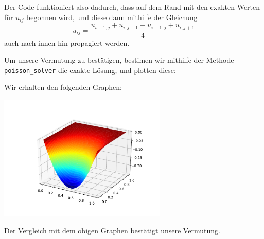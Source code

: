 Der Code funktioniert also dadurch, dass auf dem Rand mit den exakten Werten für $u_{ij}$ begonnen wird, und diese dann mithilfe der Gleichung
\[
    u_{ij}
  = \frac{u_{i-1,j} + u_{i,j-1} + u_{i+1,j} + u_{i,j+1}}{4}
\]
auch nach innen hin propagiert werden.

Um unsere Vermutung zu bestätigen, bestimen wir mithilfe der Methode \texttt{poisson\_solver} die exakte Lösung, und plotten diese:



Wir erhalten den folgenden Graphen:

\begin{center}
  \includegraphics[width = 0.6\textwidth]{chapter_04/exercise_04_23_figure_2.pdf}
\end{center}

Der Vergleich mit dem obigen Graphen bestätigt unsere Vermutung.
